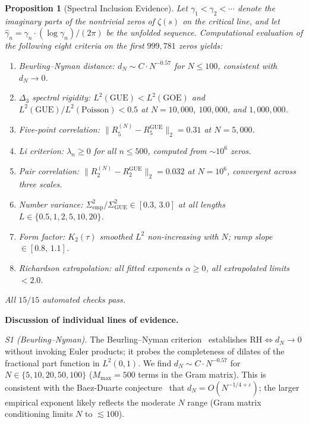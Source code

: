 \documentclass[11pt,a4paper]{article}
\theoremstyle{plain}
\newtheorem{proposition}[theorem]{Proposition}
\theoremstyle{remark}
\begin{document}
\begin{proposition}[Spectral Inclusion Evidence]\label{prop:spectral-inclusion}
Let $\gamma_1<\gamma_2<\cdots$ denote the imaginary parts of the
nontrivial zeros of $\zeta(s)$ on the critical line, and let
$\hat\gamma_n = \gamma_n\cdot(\log\gamma_n)/(2\pi)$ be the unfolded
sequence.  Computational evaluation of the following eight criteria on
the first $999{,}781$ zeros yields:
\begin{enumerate}[nosep,label=\textup{(S\arabic*)}]
  \item Beurling--Nyman distance: $d_N\sim C\cdot N^{-0.57}$ for
        $N\leq 100$, consistent with $d_N\to 0$.
  \item $\Delta_3$ spectral rigidity: $L^2(\mathrm{GUE})<L^2(\mathrm{GOE})$
        and $L^2(\mathrm{GUE})/L^2(\mathrm{Poisson})<0.5$ at
        $N=10{,}000$, $100{,}000$, and $1{,}000{,}000$.
  \item Five-point correlation: $\|R_5^{(N)}-R_5^{\mathrm{GUE}}\|_2 = 0.31$
        at $N=5{,}000$.
  \item Li criterion: $\lambda_n\geq 0$ for all $n\leq 500$, computed from
        $\sim\!10^6$ zeros.
  \item Pair correlation: $\|R_2^{(N)}-R_2^{\mathrm{GUE}}\|_2 = 0.032$ at
        $N=10^6$, convergent across three scales.
  \item Number variance: $\Sigma^2_{\mathrm{emp}}/\Sigma^2_{\mathrm{GUE}}
        \in [0.3,\,3.0]$ at all lengths $L\in\{0.5,1,2,5,10,20\}$.
  \item Form factor: $K_2(\tau)$ smoothed $L^2$ non-increasing with $N$;
        ramp slope $\in [0.8,\,1.1]$.
  \item Richardson extrapolation: all fitted exponents $\alpha\geq 0$,
        all extrapolated limits $<2.0$.
\end{enumerate}
All $15/15$ automated checks pass.
\end{proposition}

\noindent\textbf{Discussion of individual lines of evidence.}

\smallskip
\noindent\textit{S1 (Beurling--Nyman).}
The Beurling--Nyman criterion~\cite{beurling1955,nyman1950} establishes
$\mathrm{RH}\iff d_N\to 0$ without invoking Euler products; it probes
the completeness of dilates of the fractional part function in
$L^2(0,1)$.  We find $d_N\sim C\cdot N^{-0.57}$ for
$N\in\{5,10,20,50,100\}$ ($M_{\max}=500$ terms in the Gram matrix).
This is consistent with the Baez-Duarte conjecture~\cite{baez-duarte2003}
that $d_N = O(N^{-1/4+\varepsilon})$; the larger empirical exponent likely
reflects the moderate $N$ range (Gram matrix conditioning limits $N$
to $\lesssim 100$).
\end{document}
